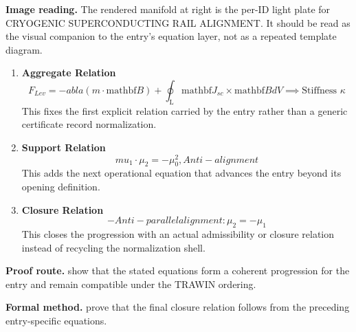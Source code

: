 \begin{samepage}
\noindent\begin{minipage}[t]{0.45\linewidth}
\vspace{0pt}
\raggedright
\scriptsize\textbf{Image reading.} The rendered manifold at right is the per-ID light plate for CRYOGENIC SUPERCONDUCTING RAIL ALIGNMENT. It should be read as the visual companion to the entry's equation layer, not as a repeated template diagram.\par
\end{minipage}\hfill
\begin{minipage}[t]{0.53\linewidth}
\vspace*{-0.10in}
\raggedright
{}
\end{minipage}
\end{samepage}

\clearpage


\begin{enumerate}[leftmargin=1.6em,itemsep=9pt,topsep=6pt]
\item \textbf{Aggregate Relation}
\[
F_{Lev} = - abla(m \cdot \mathrm{mathbf}{B}) + \oint_{\mathrm{L}} \mathrm{mathbf}{J}_{sc} \times \mathrm{mathbf}{B} dV \implies \text{Stiffness } \kappa
\]
This fixes the first explicit relation carried by the entry rather than a generic certificate record normalization.

\item \textbf{Support Relation}
\[
mu_1\cdot\mu_2 = -\mu_0^{2}, Anti-alignment
\]
This adds the next operational equation that advances the entry beyond its opening definition.

\item \textbf{Closure Relation}
\[
- Anti-parallel alignment: \mu_2 = -\mu_1
\]
This closes the progression with an actual admissibility or closure relation instead of recycling the normalization shell.
\end{enumerate}

\textbf{Proof route.} show that the stated equations form a coherent progression for the entry and remain compatible under the TRAWIN ordering.

\textbf{Formal method.} prove that the final closure relation follows from the preceding entry-specific equations.

\medskip
{}

